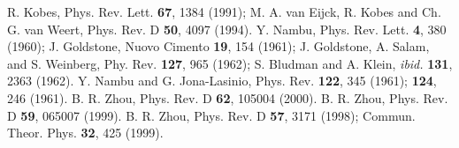 \documentclass[twocolumn,prd,showpacs,a4paper]{revtex4}
\begin{document}
\begin{references}
  R. Kobes, Phys. Rev. Lett. \textbf{67}, 1384 (1991); 
                M. A. van Eijck, R. Kobes and Ch. G. van Weert, Phys. Rev. 
                D \textbf{50}, 4097 (1994). 
  Y. Nambu, Phys. Rev. Lett. \textbf{4}, 380 (1960);
                J. Goldstone, Nuovo Cimento \textbf{19}, 154 (1961);
                J. Goldstone, A. Salam, and S. Weinberg, Phy. Rev. \textbf{127},
                965 (1962);
                S. Bludman and A. Klein, \textit{ibid.}  \textbf{131}, 2363 (1962).
  Y. Nambu and G. Jona-Lasinio, Phys. Rev. \textbf{122}, 345 (1961);
                \textbf{124}, 246 (1961).                                      
  B. R. Zhou, Phys. Rev. D \textbf{62}, 105004 (2000). 
  B. R. Zhou, Phys. Rev. D \textbf{59}, 065007 (1999).
  B. R. Zhou, Phys. Rev. D \textbf{57}, 3171 (1998); 
                 Commun. Theor. Phys. \textbf{32}, 425 (1999).  
\end{references}
\end{document}
